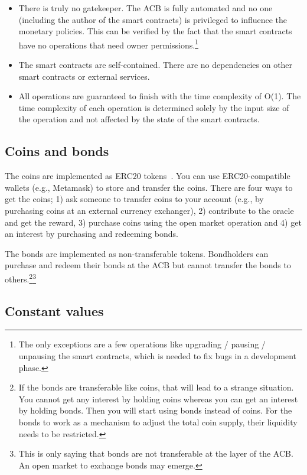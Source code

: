 \documentclass[dvipdfmx,a4paper]{article}
\begin{document}
\begin{itemize}
\item There is truly no gatekeeper. The ACB is fully automated and no one (including the author of the smart contracts) is privileged to influence the monetary policies. This can be verified by the fact that the smart contracts have no operations that need owner permissions.\footnote{The only exceptions are a few operations like upgrading / pausing / unpausing the smart contracts, which is needed to fix bugs in a development phase.}
\item The smart contracts are self-contained. There are no dependencies on other smart contracts or external services.
\item All operations are guaranteed to finish with the time complexity of O(1). The time complexity of each operation is determined solely by the input size of the operation and not affected by the state of the smart contracts.
\end{itemize}

\subsection{Coins and bonds}

The coins are implemented as ERC20 tokens~\cite{erc20token}. You can use ERC20-compatible wallets (e.g., Metamask) to store and transfer the coins. There are four ways to get the coins; 1) ask someone to transfer coins to your account (e.g., by purchasing coins at an external currency exchanger), 2) contribute to the oracle and get the reward, 3) purchase coins using the open market operation and 4) get an interest by purchasing and redeeming bonds.

The bonds are implemented as non-transferable tokens. Bondholders can purchase and redeem their bonds at the ACB but cannot transfer the bonds to others.\footnote{If the bonds are transferable like coins, that will lead to a strange situation. You cannot get any interest by holding coins whereas you can get an interest by holding bonds. Then you will start using bonds instead of coins. For the bonds to work as a mechanism to adjust the total coin supply, their liquidity needs to be restricted.}\footnote{This is only saying that bonds are not transferable at the layer of the ACB. An open market to exchange bonds may emerge.}

\subsection{Constant values}
\end{document}
